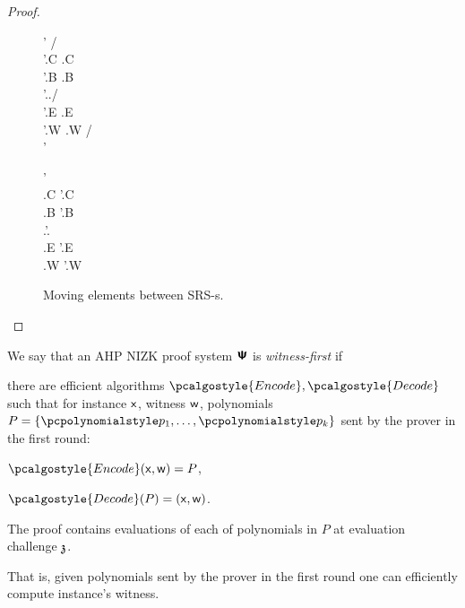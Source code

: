 \documentclass[runningheads,11pt]{llncs}
\begin{document}
\begin{proof}
\begin{figure}
\begin{pcvstack}
		\begin{pchstack}
      \procedure{$\MoveProofForward (\srs, \inp, \zkproof, \alpha)$} {
        \inp' \gets \inp / \alpha \\
        \zkproof'.C \gets \zkproof.C\\
        \zkproof'.B \gets \zkproof.B\\
        \zkproof'.\chz \gets \zkproof.\chz / \alpha\\
        \zkproof'.E \gets \zkproof.E\\
        \zkproof'.W \gets \zkproof.W / \alpha \\
      \pcreturn \zkproof'}

      \pchspace
      
       {
        \inp \gets \inp' \cdot \alpha\\
        \zkproof.C \gets \zkproof'.C\\
        \zkproof.B \gets \zkproof'.B\\
        \zkproof.\chz \gets \zkproof'.\chz \cdot \alpha\\
        \zkproof.E \gets \zkproof'.E\\
        \zkproof.W \gets \zkproof'.W \cdot \alpha \\
      \pcreturn \zkproof}
		\end{pchstack}
	\end{pcvstack}
	\caption{Moving elements between SRS-s. }
	\label{fig:operations}
  \end{figure}
\end{proof}

\begin{definition}
  \newcommand{\encode}{\pcalgostyle{Encode}}
  \newcommand{\decode}{\pcalgostyle{Decode}}
  We say that an AHP NIZK proof system $\bm{\mathsf{\Psi}}$ is \emph{witness-first} if
  \begin{compactenum}
  \item there are efficient algorithms $\encode, \decode$ such that
    for instance $\mathsf{x}$, witness $\mathsf{w}$, polynomials
    $P = \{\p{p_1}, \ldots, \p{p_k}\}$ sent by the prover in the first
    round:
    \begin{compactitem}
    \item $\encode(\inp, \wit) = P$,
    \item $\decode(P) = (\inp, \wit)$.
    \end{compactitem}
  \item The proof contains evaluations of each of polynomials in $P$ at evaluation challenge $\mathfrak{z}$.
  \end{compactenum}
  
\end{definition}
That is, given polynomials sent by the prover in the first round one
can efficiently compute instance's witness.
\end{document}
